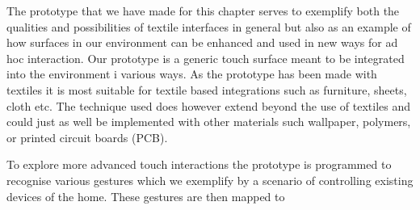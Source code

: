 The prototype that we have made for this chapter serves to exemplify both the qualities and possibilities of textile interfaces in general but also as an example of how surfaces in our environment can be enhanced and used in new ways for ad hoc interaction.
Our prototype is a generic touch surface meant to be integrated into the environment i various ways.
As the prototype has been made with textiles it is most suitable for textile based integrations such as furniture, sheets, cloth etc.
The technique used does however extend beyond the use of textiles and could just as well be implemented with other materials such wallpaper, polymers, or printed circuit boards (PCB).

To explore more advanced touch interactions the prototype is programmed to recognise various gestures which we exemplify by a scenario of controlling existing devices of the home.
These gestures are then mapped to 

